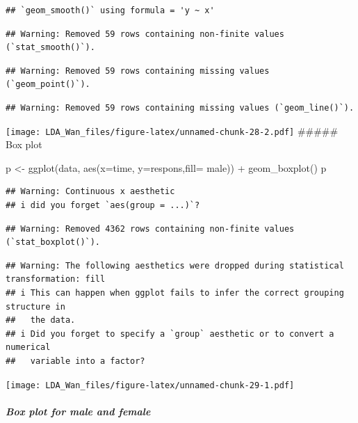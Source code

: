 \documentclass[
]{article}
\newenvironment{Shaded}{\begin{snugshade}}{\end{snugshade}}
\newcommand{\AttributeTok}[1]{\textcolor[rgb]{0.77,0.63,0.00}{#1}}
\newcommand{\FunctionTok}[1]{\textcolor[rgb]{0.00,0.00,0.00}{#1}}
\newcommand{\NormalTok}[1]{#1}
\newcommand{\OtherTok}[1]{\textcolor[rgb]{0.56,0.35,0.01}{#1}}
\newcommand{\SpecialCharTok}[1]{\textcolor[rgb]{0.00,0.00,0.00}{#1}}
\begin{document}
\begin{verbatim}
## `geom_smooth()` using formula = 'y ~ x'
\end{verbatim}

\begin{verbatim}
## Warning: Removed 59 rows containing non-finite values (`stat_smooth()`).
\end{verbatim}

\begin{verbatim}
## Warning: Removed 59 rows containing missing values (`geom_point()`).
\end{verbatim}

\begin{verbatim}
## Warning: Removed 59 rows containing missing values (`geom_line()`).
\end{verbatim}

\texttt{[image: LDA\_Wan\_files/figure-latex/unnamed-chunk-28-2.pdf]}
\#\#\#\#\# Box plot

\begin{Shaded}
\begin{Highlighting}[]
\NormalTok{p }\OtherTok{\textless{}{-}} \FunctionTok{ggplot}\NormalTok{(data, }\FunctionTok{aes}\NormalTok{(}\AttributeTok{x=}\NormalTok{time, }\AttributeTok{y=}\NormalTok{respons,}\AttributeTok{fill=}\NormalTok{ male)) }\SpecialCharTok{+}  
  \FunctionTok{geom\_boxplot}\NormalTok{()}
\NormalTok{p}
\end{Highlighting}
\end{Shaded}

\begin{verbatim}
## Warning: Continuous x aesthetic
## i did you forget `aes(group = ...)`?
\end{verbatim}

\begin{verbatim}
## Warning: Removed 4362 rows containing non-finite values (`stat_boxplot()`).
\end{verbatim}

\begin{verbatim}
## Warning: The following aesthetics were dropped during statistical transformation: fill
## i This can happen when ggplot fails to infer the correct grouping structure in
##   the data.
## i Did you forget to specify a `group` aesthetic or to convert a numerical
##   variable into a factor?
\end{verbatim}

\texttt{[image: LDA\_Wan\_files/figure-latex/unnamed-chunk-29-1.pdf]}

\hypertarget{box-plot-for-male-and-female}{%
\subparagraph{Box plot for male and
female}\label{box-plot-for-male-and-female}}
\end{document}
